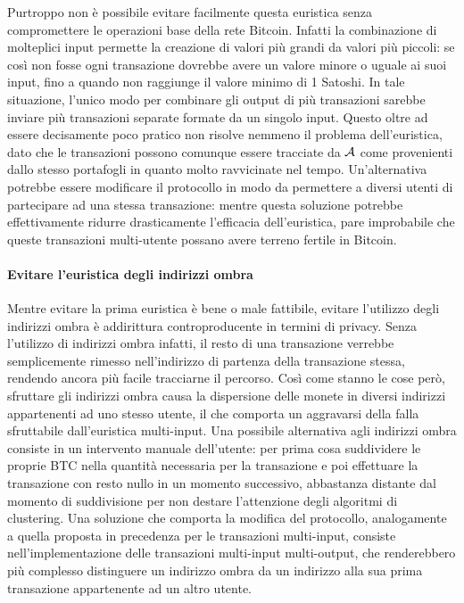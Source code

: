 Purtroppo non è possibile evitare facilmente questa euristica senza compromettere le operazioni base della rete Bitcoin.
Infatti la combinazione di molteplici input permette la creazione di valori più grandi da valori più piccoli: se così non fosse ogni transazione dovrebbe avere un valore minore o uguale ai suoi input, fino a quando non raggiunge il valore minimo di 1 Satoshi. In tale situazione, l'unico modo per combinare gli output di più transazioni sarebbe inviare più transazioni separate formate da un singolo input. Questo oltre ad essere decisamente poco pratico non risolve nemmeno il problema dell'euristica, dato che le transazioni possono comunque essere tracciate da $\mathcal{A}$ come provenienti dallo stesso portafogli in quanto molto ravvicinate nel tempo.
Un'alternativa potrebbe essere modificare il protocollo in modo da permettere a diversi utenti di partecipare ad una stessa transazione: mentre questa soluzione potrebbe effettivamente ridurre drasticamente l'efficacia dell'euristica, pare improbabile che queste transazioni multi-utente possano avere terreno fertile in Bitcoin.

\paragraph{Evitare l'euristica degli indirizzi ombra}

Mentre evitare la prima euristica è bene o male fattibile, evitare l'utilizzo degli indirizzi ombra è addirittura controproducente in termini di privacy. Senza l'utilizzo di indirizzi ombra infatti, il resto di una transazione verrebbe semplicemente rimesso nell'indirizzo di partenza della transazione stessa, rendendo ancora più facile tracciarne il percorso.
Così come stanno le cose però, sfruttare gli indirizzi ombra causa la dispersione delle monete in diversi indirizzi appartenenti ad uno stesso utente, il che comporta un aggravarsi della falla sfruttabile dall'euristica multi-input.
Una possibile alternativa agli indirizzi ombra consiste in un intervento manuale dell'utente: per prima cosa suddividere le proprie BTC nella quantità necessaria per la transazione e poi effettuare la transazione con resto nullo in un momento successivo, abbastanza distante dal momento di suddivisione per non destare l'attenzione degli algoritmi di clustering.
Una soluzione che comporta la modifica del protocollo, analogamente a quella proposta in precedenza per le transazioni multi-input, consiste nell'implementazione delle transazioni multi-input multi-output, che renderebbero più complesso distinguere un indirizzo ombra da un indirizzo alla sua prima transazione appartenente ad un altro utente.

